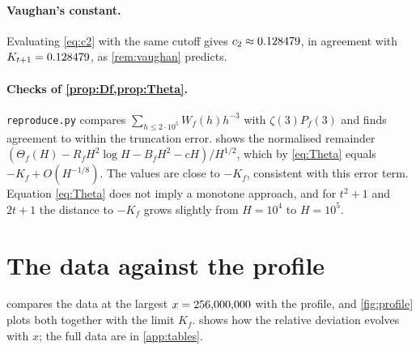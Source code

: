 \begin{table}[ht]
\centering

\caption{$K_f$ with Euler products truncated at different prime cutoffs.}\label{tab:truncation}
\end{table}

\paragraph{Vaughan's constant.} Evaluating \eqref{eq:c2} with the same cutoff gives $c_2\approx0.128479$, in agreement with $K_{t+1}=0.128479$, as \cref{rem:vaughan} predicts.

\paragraph{Checks of \cref{prop:Df,prop:Theta}.} \texttt{reproduce.py} compares $\sum_{h\le2\cdot10^5}W_f(h)h^{-3}$ with $\zeta(3)P_f(3)$ and finds agreement to within the truncation error.  shows the normalised remainder $(\Theta_f(H)-R_fH^2\log H-B_fH^2-cH)/H^{1/2}$, which by \eqref{eq:Theta} equals $-K_f+O(H^{-1/8})$. The values are close to $-K_f$, consistent with this error term. Equation \eqref{eq:Theta} does not imply a monotone approach, and for $t^2+1$ and $2t+1$ the distance to $-K_f$ grows slightly from $H=10^4$ to $H=10^5$.

\begin{table}[ht]
\centering

\caption{$(\Theta_f(H)-R_fH^2\log H-B_fH^2-cH)/H^{1/2}$ compared with $-K_f$.}\label{tab:theta}
\end{table}

\section{The data against the profile}

 compares the data at the largest $x=\xmaxdata$ with the profile, and \cref{fig:profile} plots both together with the limit $K_f$.  shows how the relative deviation evolves with $x$; the full data are in \cref{app:tables}.

\begin{table}[ht]
\centering
\small

\caption{Normalised variance at $x=\xmaxdata$ against the predicted profile $N_{\mathrm{pred}}=F_f(H)H^{3/2}$, $H=x/f(y)$; $r$ is the target ratio.}\label{tab:profile}
\end{table}

